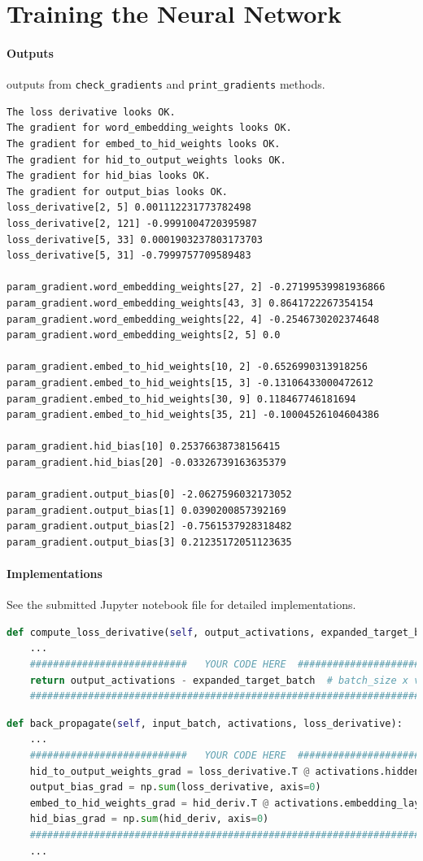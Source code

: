 \documentclass{article}
\begin{document}
    \section{Training the Neural Network}
    \paragraph{Outputs} outputs from \texttt{check\_gradients} and \texttt{print\_gradients} methods.
    \begin{lstlisting}
The loss derivative looks OK.
The gradient for word_embedding_weights looks OK.
The gradient for embed_to_hid_weights looks OK.
The gradient for hid_to_output_weights looks OK.
The gradient for hid_bias looks OK.
The gradient for output_bias looks OK.
loss_derivative[2, 5] 0.001112231773782498
loss_derivative[2, 121] -0.9991004720395987
loss_derivative[5, 33] 0.0001903237803173703
loss_derivative[5, 31] -0.7999757709589483

param_gradient.word_embedding_weights[27, 2] -0.27199539981936866
param_gradient.word_embedding_weights[43, 3] 0.8641722267354154
param_gradient.word_embedding_weights[22, 4] -0.2546730202374648
param_gradient.word_embedding_weights[2, 5] 0.0

param_gradient.embed_to_hid_weights[10, 2] -0.6526990313918256
param_gradient.embed_to_hid_weights[15, 3] -0.13106433000472612
param_gradient.embed_to_hid_weights[30, 9] 0.118467746181694
param_gradient.embed_to_hid_weights[35, 21] -0.10004526104604386

param_gradient.hid_bias[10] 0.25376638738156415
param_gradient.hid_bias[20] -0.03326739163635379

param_gradient.output_bias[0] -2.0627596032173052
param_gradient.output_bias[1] 0.0390200857392169
param_gradient.output_bias[2] -0.7561537928318482
param_gradient.output_bias[3] 0.21235172051123635
    \end{lstlisting}
    \paragraph{Implementations} See the submitted Jupyter notebook file for detailed implementations.
    \begin{lstlisting}[language=Python]
def compute_loss_derivative(self, output_activations, expanded_target_batch):
	...
    ###########################   YOUR CODE HERE  ##############################
    return output_activations - expanded_target_batch  # batch_size x vocab_size
    ############################################################################
    \end{lstlisting}
    \begin{lstlisting}[language=Python]
def back_propagate(self, input_batch, activations, loss_derivative):
	...
	###########################   YOUR CODE HERE  ##############################
	hid_to_output_weights_grad = loss_derivative.T @ activations.hidden_layer
	output_bias_grad = np.sum(loss_derivative, axis=0)
	embed_to_hid_weights_grad = hid_deriv.T @ activations.embedding_layer
	hid_bias_grad = np.sum(hid_deriv, axis=0)
	############################################################################
	...
    \end{lstlisting}
    
\end{document}
